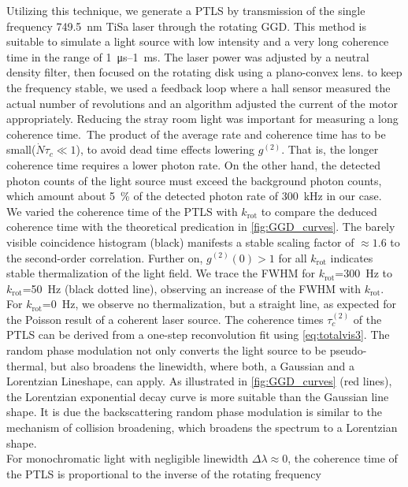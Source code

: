 Utilizing this technique, we generate a \ac{PTLS} by transmission of the single frequency \SI{749.5}{\nm} TiSa laser through the rotating \ac{GGD}. This method is suitable to simulate a light source with low intensity and a very long coherence time \cite{martienssen_coherence_1964,estes_scattering_1971} in the range of \SI{1}{\us}--\SI{1}{\ms}. The laser power was adjusted by a neutral density filter, then focused on the rotating disk using a plano-convex lens. to keep the frequency stable, we used a feedback loop where a hall sensor measured the actual number of revolutions and an algorithm adjusted the current of the motor appropriately. Reducing the stray room light was important for measuring a long coherence time.~The product of the average rate and coherence time has to be small($\dot{N}\tau_c\ll1$), to avoid dead time effects lowering $g^{(2)}$. That is, the longer coherence time requires a lower photon rate. On the other hand, the detected photon counts of the light source must exceed the background photon counts, which amount about \SI{5}{\percent} of the detected photon rate of \SI{300}{\kHz} in our case.\\
We varied the coherence time of the \ac{PTLS} with $k_\mathrm{rot}$ to compare the deduced coherence time with the theoretical predication in \cref{fig:GGD_curves}. The barely visible coincidence histogram (black) manifests a stable scaling factor of $\approx 1.6$ to the second-order correlation. Further on, $g^{(2)}(0)>1$ for all $k_\mathrm{rot}$ indicates stable thermalization of the light field. We trace the \ac{FWHM} for $k_\mathrm{rot}$=\SI{300}{\Hz} to $k_\mathrm{rot}$=\SI{50}{\Hz} (black dotted line), observing an increase of the FWHM with $k_\mathrm{rot}$. For $k_\mathrm{rot}$=\SI{0}{\Hz}, we observe no thermalization, but a straight line, as expected for the Poisson result of a coherent laser source.
The coherence times $\tau_c^{(2)}$ of the \ac{PTLS} can be derived from a one-step reconvolution fit using \cref{eq:totalvis3}.
The random phase modulation not only converts the light source to be pseudo-thermal, but also broadens the linewidth, where both, a Gaussian and a Lorentzian Lineshape, can apply. As illustrated in \cref{fig:GGD_curves} (red lines), the Lorentzian exponential decay curve is more suitable than the Gaussian line shape. It is due the backscattering random phase modulation is similar to the mechanism of collision broadening, which broadens the spectrum to a Lorentzian shape.\\
For monochromatic light with negligible linewidth $\Delta\lambda\approx 0$, the coherence time of the \ac{PTLS} is proportional to the inverse of the rotating frequency \cite{estes_scattering_1971}
